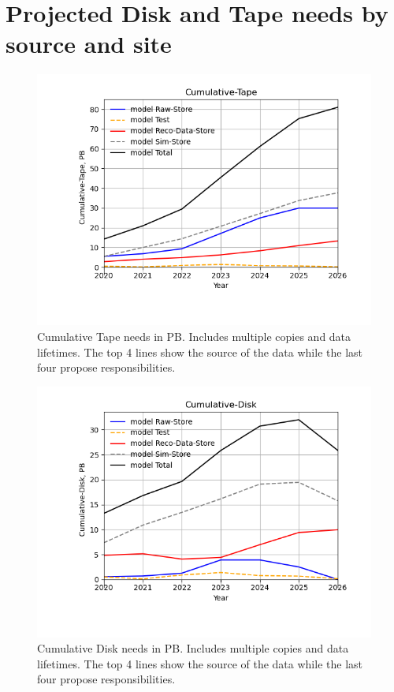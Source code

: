 \section{Projected Disk and Tape needs by source and site}
\begin{figure}[h]
\centering\includegraphics[height=0.4\textwidth]{MoreSim_2022-12-02-2026/MoreSim_2022-12-02-2026-Cumulative-Tape.png}
\caption{Cumulative Tape needs in PB. Includes multiple copies and data lifetimes. The top 4 lines show the source of the data while the last four propose responsibilities.}
\label{fig:Cumulative-Tape}
\end{figure}
\begin{figure}[h]
\centering\includegraphics[height=0.4\textwidth]{MoreSim_2022-12-02-2026/MoreSim_2022-12-02-2026-Cumulative-Disk.png}
\caption{Cumulative Disk needs in PB. Includes multiple copies and data lifetimes. The top 4 lines show the source of the data while the last four propose responsibilities.}
\label{fig:Cumulative-Disk}
\end{figure}
